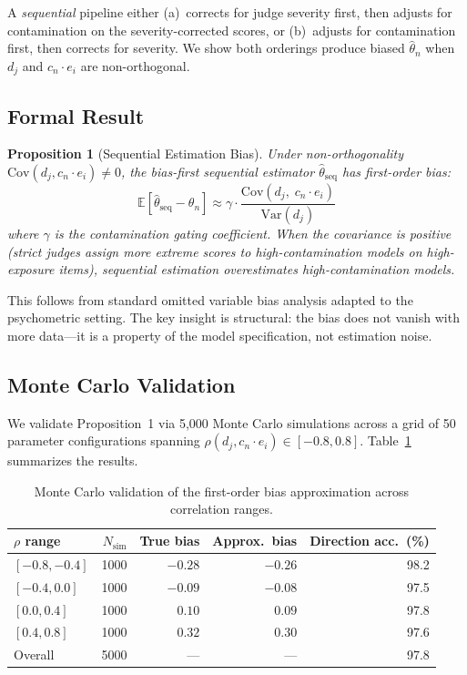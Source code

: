 \documentclass[11pt,a4paper]{article}
\newtheorem{proposition}{Proposition}
\begin{document}
A \emph{sequential} pipeline either (a)~corrects for judge severity first, then adjusts for contamination on the severity-corrected scores, or (b)~adjusts for contamination first, then corrects for severity. We show both orderings produce biased $\hat{\theta}_n$ when $d_j$ and $c_n \cdot e_i$ are non-orthogonal.

\subsection{Formal Result}

\begin{proposition}[Sequential Estimation Bias]
Under non-orthogonality $\mathrm{Cov}(d_j, c_n \cdot e_i) \neq 0$, the bias-first sequential estimator $\hat{\theta}_{\mathrm{seq}}$ has first-order bias:
\[
\mathbb{E}[\hat{\theta}_{\mathrm{seq}} - \theta_n] \approx \gamma \cdot \frac{\mathrm{Cov}(d_j,\; c_n \cdot e_i)}{\mathrm{Var}(d_j)}
\]
where $\gamma$ is the contamination gating coefficient. When the covariance is positive (strict judges assign more extreme scores to high-contamination models on high-exposure items), sequential estimation overestimates high-contamination models.
\end{proposition}

\noindent This follows from standard omitted variable bias analysis adapted to the psychometric setting. The key insight is structural: the bias does not vanish with more data---it is a property of the model specification, not estimation noise.

\subsection{Monte Carlo Validation}

We validate Proposition~1 via 5,000 Monte Carlo simulations across a grid of 50 parameter configurations spanning $\rho(d_j, c_n \cdot e_i) \in [-0.8, 0.8]$. Table~\ref{tab:mc_bias} summarizes the results.

\begin{table}[h]
\centering
\caption{Monte Carlo validation of the first-order bias approximation across correlation ranges.}
\label{tab:mc_bias}
\small
\begin{tabular}{lrrrr}
\toprule
$\rho$ range & $N_{\mathrm{sim}}$ & True bias & Approx.\ bias & Direction acc.\ (\%) \\
\midrule
$[-0.8, -0.4]$ & 1000 & $-0.28$ & $-0.26$ & 98.2 \\
$[-0.4, 0.0]$ & 1000 & $-0.09$ & $-0.08$ & 97.5 \\
$[0.0, 0.4]$ & 1000 & $0.10$ & $0.09$ & 97.8 \\
$[0.4, 0.8]$ & 1000 & $0.32$ & $0.30$ & 97.6 \\
\midrule
Overall & 5000 & --- & --- & 97.8 \\
\bottomrule
\end{tabular}
\end{table}
\end{document}
